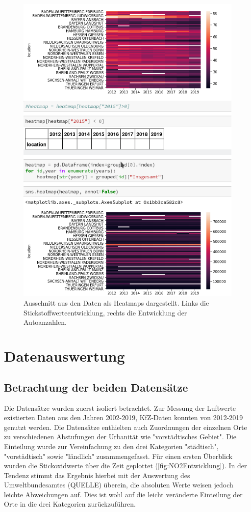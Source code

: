 \documentclass[11pt,a4paper,oneside,german]{article}
\begin{document}
	\begin{figure}[h!]
		\centering
		\includegraphics[width=12cm]{Heatmaps.png}
		\caption{Ausschnitt aus den Daten als Heatmaps dargestellt. Links die Stickstoffwerteentwicklung, rechts die Entwicklung der Autoanzahlen.}
		\label{fig:Heatmaps}
	\end{figure}
	
	\section{Datenauswertung}
	
	\subsection{Betrachtung der beiden Datensätze}
	
	Die Datensätze wurden zuerst isoliert betrachtet. Zur Messung der Luftwerte existierten Daten aus den Jahren 2002-2019, KfZ-Daten konnten von 2012-2019 genutzt werden. Die  Datensätze enthielten auch Zuordnungen der einzelnen Orte zu verschiedenen Abstufungen der Urbanität wie "vorstädtisches Gebiet". Die Einteilung wurde zur Vereinfachung zu den drei Kategorien "städtisch", "vorstädtisch" sowie "ländlich" zusammengefasst. Für einen ersten Überblick wurden die Stickoxidwerte über die Zeit geplottet (\ref{fig:NO2Entwicklung}). In der Tendenz stimmt das Ergebnis hierbei mit der Auswertung des Umweltbundesamtes (QUELLE) überein, die absoluten Werte weisen jedoch leichte Abweichungen auf. Dies ist wohl auf die leicht veränderte Einteilung der Orte in die drei Kategorien zurückzuführen.\\
	
\end{document}
